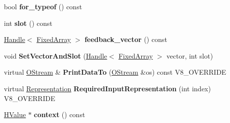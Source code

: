 \begin{DoxyCompactItemize}
\item 
\hypertarget{classv8_1_1internal_1_1_v8___f_i_n_a_l_a3c0185ec5f6ad1fafc6ebc1d036d0040}{}bool {\bfseries for\+\_\+typeof} () const \label{classv8_1_1internal_1_1_v8___f_i_n_a_l_a3c0185ec5f6ad1fafc6ebc1d036d0040}

\item 
\hypertarget{classv8_1_1internal_1_1_v8___f_i_n_a_l_ab2e2be77bd895fae71de18a24a557643}{}int {\bfseries slot} () const \label{classv8_1_1internal_1_1_v8___f_i_n_a_l_ab2e2be77bd895fae71de18a24a557643}

\item 
\hypertarget{classv8_1_1internal_1_1_v8___f_i_n_a_l_a9db8e7d077e3e906a25da2747defc827}{}\hyperlink{classv8_1_1internal_1_1_handle}{Handle}$<$ \hyperlink{classv8_1_1internal_1_1_fixed_array}{Fixed\+Array} $>$ {\bfseries feedback\+\_\+vector} () const \label{classv8_1_1internal_1_1_v8___f_i_n_a_l_a9db8e7d077e3e906a25da2747defc827}

\item 
\hypertarget{classv8_1_1internal_1_1_v8___f_i_n_a_l_a7a756c295327d9268449fa3c63e659cc}{}void {\bfseries Set\+Vector\+And\+Slot} (\hyperlink{classv8_1_1internal_1_1_handle}{Handle}$<$ \hyperlink{classv8_1_1internal_1_1_fixed_array}{Fixed\+Array} $>$ vector, int slot)\label{classv8_1_1internal_1_1_v8___f_i_n_a_l_a7a756c295327d9268449fa3c63e659cc}

\item 
\hypertarget{classv8_1_1internal_1_1_v8___f_i_n_a_l_ac450dad970b14246be761ccf5004924b}{}virtual \hyperlink{classv8_1_1internal_1_1_o_stream}{O\+Stream} \& {\bfseries Print\+Data\+To} (\hyperlink{classv8_1_1internal_1_1_o_stream}{O\+Stream} \&os) const V8\+\_\+\+O\+V\+E\+R\+R\+I\+D\+E\label{classv8_1_1internal_1_1_v8___f_i_n_a_l_ac450dad970b14246be761ccf5004924b}

\item 
\hypertarget{classv8_1_1internal_1_1_v8___f_i_n_a_l_a6c6d1f37f40b113d8f4062f1ffff7215}{}virtual \hyperlink{classv8_1_1internal_1_1_representation}{Representation} {\bfseries Required\+Input\+Representation} (int index) V8\+\_\+\+O\+V\+E\+R\+R\+I\+D\+E\label{classv8_1_1internal_1_1_v8___f_i_n_a_l_a6c6d1f37f40b113d8f4062f1ffff7215}

\item 
\hypertarget{classv8_1_1internal_1_1_v8___f_i_n_a_l_a8294bece2df148267ec52228e2139030}{}\hyperlink{classv8_1_1internal_1_1_h_value}{H\+Value} $\ast$ {\bfseries context} () const \label{classv8_1_1internal_1_1_v8___f_i_n_a_l_a8294bece2df148267ec52228e2139030}


\end{DoxyCompactItemize}

